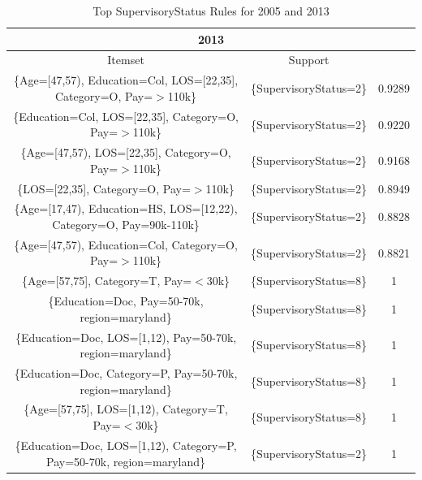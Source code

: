 \documentclass{article}
\begin{document}
\begin{center}
\begin{table}
\begin{tabular}{ |c|c|c| }
                \hline
                \multicolumn{3}{|c|}{2013} \\
                \hline
                Itemset & Support \\
                \hline
                \{Age=[47,57),
                Education=Col,
                LOS=[22,35],
                Category=O,
                Pay=$>$110k\} & \{SupervisoryStatus=2\} & 0.9289 \\
                \{Education=Col,
                LOS=[22,35],
                Category=O,
                Pay=$>$110k\} & \{SupervisoryStatus=2\} & 0.9220 \\
                \{Age=[47,57),
                LOS=[22,35],
                Category=O,
                Pay=$>$110k\} & \{SupervisoryStatus=2\} & 0.9168 \\
                \{LOS=[22,35],
                Category=O,
                Pay=$>$110k\} & \{SupervisoryStatus=2\} & 0.8949 \\
                \{Age=[17,47),
                Education=HS,
                LOS=[12,22),
                Category=O,
                Pay=90k-110k\} & \{SupervisoryStatus=2\} & 0.8828 \\
                \{Age=[47,57),
                Education=Col,
                Category=O,
                Pay=$>$110k\} & \{SupervisoryStatus=2\} & 0.8821 \\
                \{Age=[57,75],
                Category=T,
                Pay=$<$30k\} & \{SupervisoryStatus=8\} & 1 \\
                \{Education=Doc,
                Pay=50-70k,
                region=maryland\} & \{SupervisoryStatus=8\} & 1 \\
                \{Education=Doc,
                LOS=[1,12),
                Pay=50-70k,
                region=maryland\} & \{SupervisoryStatus=8\} & 1 \\
                \{Education=Doc,
                Category=P,
                Pay=50-70k,
                region=maryland\} & \{SupervisoryStatus=8\} & 1 \\
                \{Age=[57,75],
                LOS=[1,12),
                Category=T,
                Pay=$<$30k\} & \{SupervisoryStatus=8\} & 1 \\
                \{Education=Doc,
                LOS=[1,12),
                Category=P,
                Pay=50-70k,
                region=maryland\} & \{SupervisoryStatus=2\} & 1 \\
                \hline
            \end{tabular}
            \caption{Top SupervisoryStatus Rules for 2005 and 2013}
            \label{tab:8}
        \end{table}
    \end{center}
\end{document}
